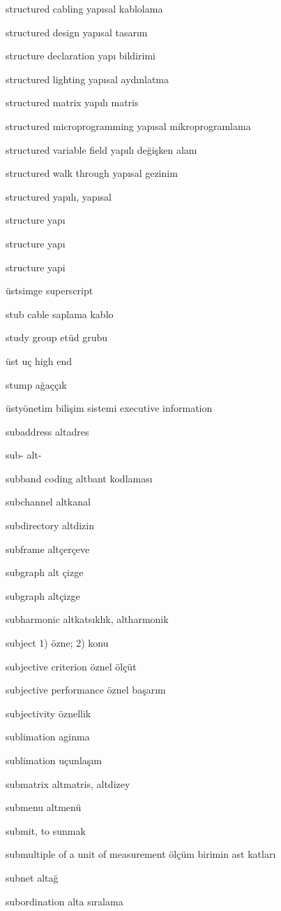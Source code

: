 \documentclass[12pt,fleqn]{article}\usepackage{../../common}
\begin{document}
structured cabling yapısal kablolama

structured design yapısal tasarım

structure declaration yapı bildirimi

structured lighting yapısal aydınlatma

structured matrix yapılı matris

structured microprogramming yapısal mikroprogramlama

structured variable field yapılı değişken alanı

structured walk through yapısal gezinim

structured yapılı, yapısal

structure yapı

structure yapı

structure yapi

üstsimge superscript

stub cable saplama kablo

study group etüd grubu

üst uç high end

stump ağaççık

üstyönetim bilişim sistemi executive information

subaddress altadres

sub- alt-

subband coding altbant kodlaması

subchannel altkanal

subdirectory altdizin

subframe altçerçeve

subgraph alt çizge

subgraph altçizge

subharmonic altkatsıklık, altharmonik

subject 1) özne; 2) konu

subjective criterion öznel ölçüt

subjective performance öznel başarım

subjectivity öznellik

sublimation aginma

sublimation uçunlaşım

submatrix altmatris, altdizey

submenu altmenü

submit, to sunmak

submultiple of a unit of measurement ölçüm birimin ast katları

subnet altağ

subordination alta sıralama
\end{document}
